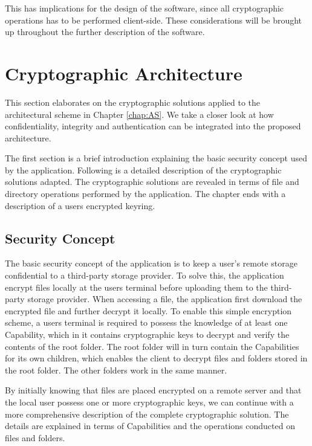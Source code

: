 \documentclass[pdftex,english,10pt,b5paper,twoside]{book}
\begin{document}
This has implications for the design of the software, since all cryptographic
operations has to be performed client-side. These considerations will be
brought up throughout the further description of the software.

\section{Cryptographic Architecture}
\label{chap:CS} 

This section elaborates on the cryptographic solutions applied to the
architectural scheme in Chapter \ref{chap:AS}. We take a closer look at how
confidentiality, integrity and authentication can be integrated into the
proposed architecture.


The first section is a brief introduction explaining the basic security concept
used by the application. Following is a detailed description of the
cryptographic solutions adapted. The cryptographic solutions are revealed in
terms of file and directory operations performed by the application. The
chapter ends with a description of a users encrypted keyring.

\subsection{Security Concept}

The basic security concept of the application is to keep a user's remote
storage confidential to a third-party storage provider. To solve this, the
application encrypt files locally at the users terminal before uploading them
to the third-party storage provider. When accessing a file, the application
first download the encrypted file and further decrypt it locally. To enable
this simple encryption scheme, a users terminal is required to possess the
knowledge of at least one Capability, which in it contains cryptographic keys
to decrypt and verify the contents of the root folder. The root folder will in
turn contain the Capabilities for its own children, which enables the client to
decrypt files and folders stored in the root folder. The other folders work in
the same manner.

By initially knowing that files are placed encrypted on a remote server and that
the local user possess one or more cryptographic keys, we can continue with a
more comprehensive description of the complete cryptographic solution. The
details are explained in terms of Capabilities and the operations conducted on
files and folders.
\end{document}
